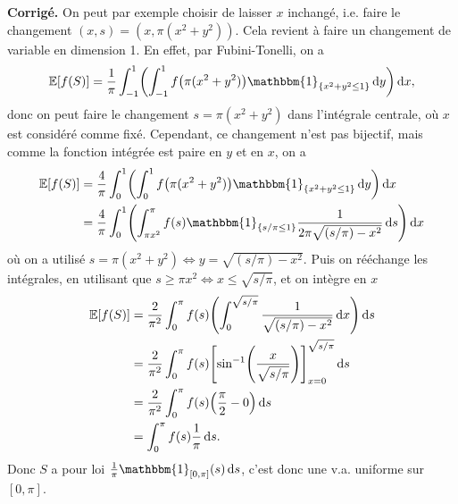 \documentclass[a4paper,11pt]{article}
\let\originalleft\left
\let\originalright\right
\renewcommand{\left}{\mathopen{}\mathclose\bgroup\originalleft}
\renewcommand{\right}{\aftergroup\egroup\originalright}
\newcommand{\1}{\mathbbm{1}}
\newcommand{\Ec}[1]{\mathbb{E} \left[#1\right]}
\newcommand{\diff}{\mathop{}\mathopen{}\mathrm{d}}
\theoremstyle{plain}
\theoremstyle{definition}
\renewenvironment{comment}{\medskip\noindent \textcolor{BrickRed}{\textbf{Corrigé.}}}{}
\begin{document}
\begin{comment}
	      On peut par exemple choisir de laisser $x$ inchangé, i.e. faire le changement $(x,s) = (x,\pi(x^2+y^2))$.
	      Cela revient à faire un changement de variable en dimension 1.
	      En effet, par Fubini-Tonelli, on a
	      \[
		      \Ec{f(S)}
		      =  \frac{1}{\pi} \int_{-1}^1 \left( \int_{-1}^1 f\left(\pi(x^2+y^2)\right) \1_{\{ x^2+y^2 \leq 1 \}} \diff y \right) \diff x,
	      \]
	      donc on peut faire le changement $s = \pi(x^2+y^2)$ dans l'intégrale centrale, où $x$ est considéré comme fixé.
	      Cependant, ce changement n'est pas bijectif, mais comme la fonction intégrée est paire en $y$ et en $x$, on a
	      \begin{align*}
		      \Ec{f(S)}
		       & = \frac{4}{\pi} \int_0^1 \left( \int_0^1 f\left(\pi(x^2+y^2)\right) \1_{\{ x^2+y^2 \leq 1 \}} \diff y \right) \diff x                          \\
		       & = \frac{4}{\pi} \int_0^1 \left( \int_{\pi x^2}^{\pi} f(s) \1_{\{ s/\pi \leq 1 \}} \frac{1}{2 \pi \sqrt{(s/\pi) - x^2}} \diff s \right) \diff x
	      \end{align*}
	      où on a utilisé $s = \pi(x^2+y^2) \Leftrightarrow y = \sqrt{(s/\pi) - x^2}$.
	      Puis on rééchange les intégrales, en utilisant que $s \geq \pi x^2 \Leftrightarrow x \leq \sqrt{s/\pi}$, et on intègre en $x$
	      \begin{align*}
		      \Ec{f(S)}
		       & = \frac{2}{\pi^2} \int_0^{\pi} f(s) \left( \int_{0}^{\sqrt{s/\pi}} \frac{1}{\sqrt{(s/\pi) - x^2}} \diff x \right) \diff s       \\
		       & = \frac{2}{\pi^2} \int_0^{\pi} f(s) \left[ \sin^{-1} \left( \frac{x}{\sqrt{s/\pi}} \right) \right]_{x=0}^{\sqrt{s/\pi}} \diff s \\
		       & = \frac{2}{\pi^2} \int_0^{\pi} f(s) \left( \frac{\pi}{2} - 0 \right) \diff s                                                    \\
		       & = \int_0^{\pi} f(s) \frac{1}{\pi} \diff s.
	      \end{align*}
	      Donc $S$ a pour loi $\frac{1}{\pi} \1_{[0,\pi]}(s) \diff s$, c'est donc une v.a. uniforme sur $[0,\pi]$.

        \medskip


\end{comment}
\end{document}

